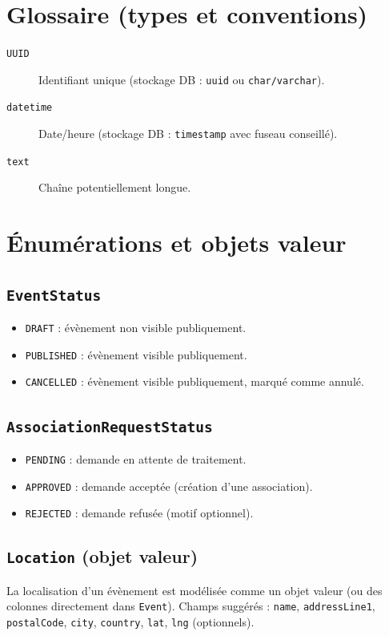 \documentclass[11pt,a4paper]{article}
\begin{document}
\section{Glossaire (types et conventions)}
\begin{description}
  \item[\texttt{UUID}] Identifiant unique (stockage DB : \texttt{uuid} ou \texttt{char/varchar}).
  \item[\texttt{datetime}] Date/heure (stockage DB : \texttt{timestamp} avec fuseau conseillé).
  \item[\texttt{text}] Chaîne potentiellement longue.
\end{description}

\section{Énumérations et objets valeur}
\subsection{\texttt{EventStatus}}
\begin{itemize}
  \item \texttt{DRAFT} : évènement non visible publiquement.
  \item \texttt{PUBLISHED} : évènement visible publiquement.
  \item \texttt{CANCELLED} : évènement visible publiquement, marqué comme annulé.
\end{itemize}

\subsection{\texttt{AssociationRequestStatus}}
\begin{itemize}
  \item \texttt{PENDING} : demande en attente de traitement.
  \item \texttt{APPROVED} : demande acceptée (création d’une association).
  \item \texttt{REJECTED} : demande refusée (motif optionnel).
\end{itemize}

\subsection{\texttt{Location} (objet valeur)}
La localisation d’un évènement est modélisée comme un objet valeur (ou des colonnes directement dans \texttt{Event}).
Champs suggérés : \texttt{name}, \texttt{addressLine1}, \texttt{postalCode}, \texttt{city}, \texttt{country}, \texttt{lat}, \texttt{lng} (optionnels).
\end{document}
